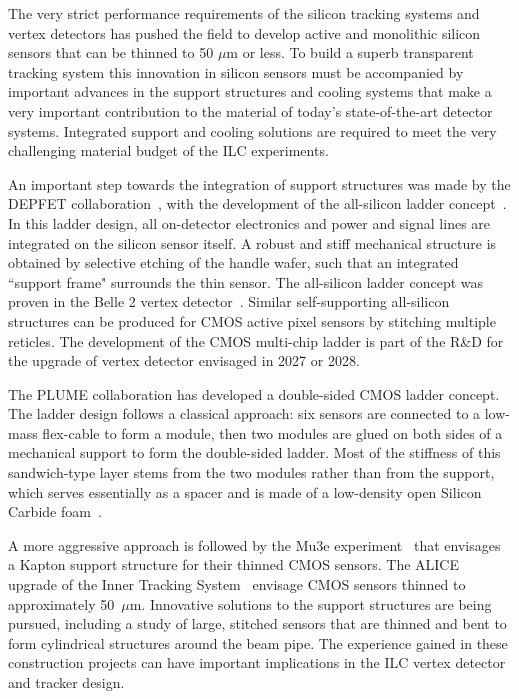 The very strict performance requirements of the silicon tracking systems and vertex detectors has pushed the field to develop active and monolithic silicon sensors that can be thinned to 50 $\mu\mathrm{m}$ or less. To build a superb transparent tracking system this innovation in silicon sensors must be accompanied by important advances in the support structures and cooling systems that make a very important contribution to the material of today's state-of-the-art detector systems. Integrated support and cooling solutions are required to meet the very challenging material budget of the ILC experiments.

An important step towards the integration of support structures was made by the DEPFET collaboration~\cite{DEPFET:2012apm}, with the development of the all-silicon ladder concept~\cite{Fischer:2007zzm}. In this ladder design, all on-detector electronics and power and signal lines are integrated on the silicon sensor itself. A robust and stiff mechanical structure is obtained by selective etching of the handle wafer, such that an integrated ``support frame" surrounds the thin sensor. The all-silicon ladder concept was proven in the Belle 2 vertex detector~\cite{Belle-II:2010dht}. Similar self-supporting all-silicon structures can be produced for CMOS active pixel sensors by stitching multiple reticles. The development of the CMOS multi-chip ladder is part of the R\&D for the upgrade of vertex detector envisaged in 2027 or 2028. 

The PLUME collaboration has developed a double-sided CMOS ladder concept. The ladder
design follows a classical approach: six sensors are connected to a low-mass flex-cable to
form a module, then two modules are glued on both sides of a mechanical support to form
the double-sided ladder. Most of the stiffness of this sandwich-type layer stems from the
two modules rather than from the support, which serves essentially as a spacer and is made of a low-density open Silicon Carbide foam~\cite{Baudot:2012mg}. 

A more aggressive approach is followed by the Mu3e experiment~\cite{Mu3e:2020gyw} that envisages a Kapton support structure for their thinned CMOS sensors. The ALICE upgrade of the Inner Tracking System~\cite{ALICE:2013nwm} envisage CMOS sensors thinned to approximately 50~$\mu\mathrm{m}$. Innovative solutions to the support structures are being pursued, including a study of large, stitched sensors that are thinned and bent to form cylindrical structures around the beam pipe. The experience gained in these construction projects can have important implications in the ILC vertex detector and tracker design.


